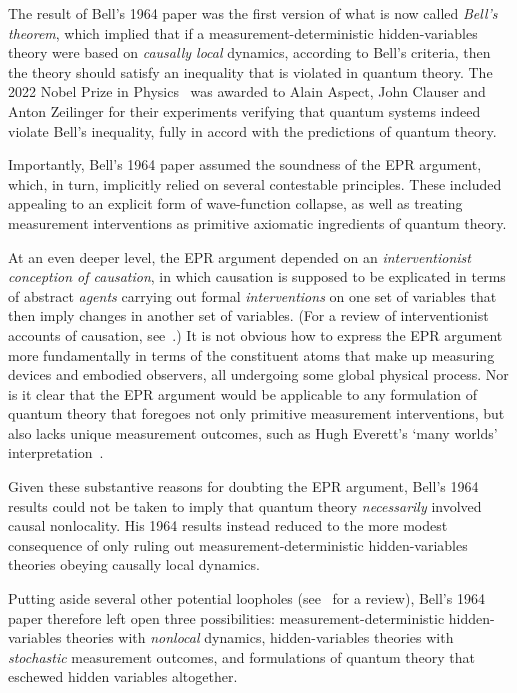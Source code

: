 \documentclass[12pt,english,prl,superscriptaddress,nobibnotes,nofootinbib]{revtex4-2}
\begin{document}
The result of Bell's 1964 paper was the first version of what is now
called \emph{Bell's theorem}, which implied that if a measurement-deterministic
hidden-variables theory were based on \emph{causally local} dynamics,
according to Bell's criteria, then the theory should satisfy an inequality
that is violated in quantum theory. The 2022 Nobel Prize in Physics~\citep{AspectClauserZeilinger:2022tnpip2}
was awarded to Alain Aspect, John Clauser and Anton Zeilinger for
their experiments verifying that quantum systems indeed violate Bell's
inequality, fully in accord with the predictions of quantum theory.

Importantly, Bell's 1964 paper assumed the soundness of the EPR argument,
which, in turn, implicitly relied on several contestable principles.
These included appealing to an explicit form of wave-function collapse,
as well as treating measurement interventions as primitive axiomatic
ingredients of quantum theory.

At an even deeper level, the EPR argument depended on an \emph{interventionist conception of causation},
in which causation is supposed to be explicated in terms of abstract
\emph{agents} carrying out formal \emph{interventions} on one set
of variables that then imply changes in another set of variables.
(For a review of interventionist accounts of causation, see~\citep{Woodward:2023cam}.)
It is not obvious how to express the EPR argument more fundamentally
in terms of the constituent atoms that make up measuring devices and
embodied observers, all undergoing some global physical process. Nor
is it clear that the EPR argument would be applicable to any formulation
of quantum theory that foregoes not only primitive measurement interventions,
but also lacks unique measurement outcomes, such as Hugh Everett's
\textquoteleft many worlds\textquoteright{} interpretation~\citep{Everett:1957rsfqm,Everett:1973tuwf,DeWitt:1970qmr}.

Given these substantive reasons for doubting the EPR argument, Bell's
1964 results could not be taken to imply that quantum theory \emph{necessarily}
involved causal nonlocality. His 1964 results instead reduced to the
more modest consequence of only ruling out measurement-deterministic
hidden-variables theories obeying causally local dynamics.

Putting aside several other potential loopholes (see~\citep{MyrvoldGenoveseShimony:2024bst}
for a review), Bell's 1964 paper therefore left open three possibilities:
measurement-deterministic hidden-variables theories with \emph{nonlocal}
dynamics, hidden-variables theories with \emph{stochastic} measurement
outcomes, and formulations of quantum theory that eschewed hidden
variables altogether.
\end{document}
